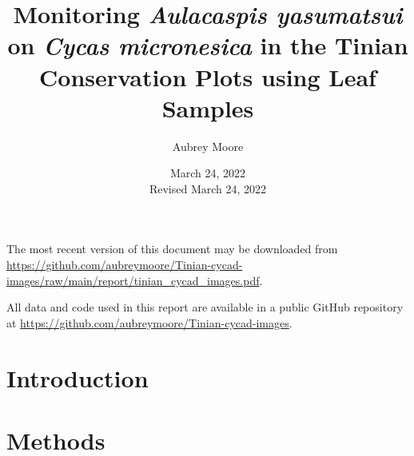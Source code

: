 \documentclass[12pt,letterpaper,english,bibliography=totocnumbered, abstract=on]{scrartcl}
\begin{document}
\titlehead{Technical Report}

\title{Monitoring \textit{Aulacaspis yasumatsui} on \textit{Cycas micronesica} in the Tinian Conservation Plots using Leaf Samples}

\author{Aubrey Moore}

\date{March 24, 2022\\Revised March 24, 2022}

\maketitle
\newpage
\tableofcontents

\pagebreak

The most recent version of this document may be downloaded from \url{https://github.com/aubreymoore/Tinian-cycad-images/raw/main/report/tinian_cycad_images.pdf}.

All data and code used in this report are available in a public GitHub repository at
\url{https://github.com/aubreymoore/Tinian-cycad-images}.

\section{Introduction}



\section{Methods}
\end{document}
